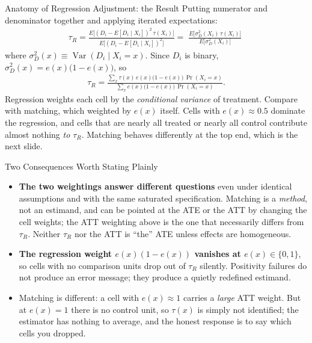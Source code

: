 \documentclass[aspectratio=169,11pt,xcolor=dvipsnames]{beamer}
\DeclareMathOperator{\Var}{Var}
\newcommand{\E}{E}
\begin{document}
\begin{frame}{Anatomy of Regression Adjustment: the Result}
Putting numerator and denominator together and applying iterated expectations:
\begin{align*}
  \tau_R
  = \frac{\E\big[(D_i-\E[D_i\mid X_i])^2\,\tau(X_i)\big]}
         {\E\big[(D_i-\E[D_i\mid X_i])^2\big]}
  = \boxed{\;\frac{\E\big[\sigma_D^2(X_i)\,\tau(X_i)\big]}{\E\big[\sigma_D^2(X_i)\big]}\;}
\end{align*}
where $\sigma_D^2(x) \equiv \Var(D_i\mid X_i = x)$. Since $D_i$ is binary,
$\sigma^2_D(x) = e(x)\big(1-e(x)\big)$, so
\begin{align*}
  \tau_R = \frac{\sum_x \tau(x)\, e(x)\big(1-e(x)\big)\,\Pr(X_i=x)}
                  {\sum_x e(x)\big(1-e(x)\big)\,\Pr(X_i=x)} .
\end{align*}
\vskip2pt
\alert{Regression weights each cell by the \emph{conditional variance} of
treatment.} Compare with matching, which weighted by $e(x)$ itself. Cells with
$e(x)\approx 0.5$ dominate the regression, and cells that are nearly all treated
or nearly all control contribute almost nothing \emph{to $\tau_R$}. Matching
behaves differently at the top end, which is the next slide.
\end{frame}

\begin{frame}[allowframebreaks,t]{Two Consequences Worth Stating Plainly}
\begin{itemize}\itemsep4pt
  \item \textbf{The two weightings answer different questions} even under
        identical assumptions and with the same saturated specification. Matching
        is a \emph{method}, not an estimand, and can be pointed at the ATE or the
        ATT by changing the cell weights; the ATT weighting above is the one that
        necessarily differs from $\tau_R$. Neither $\tau_R$ nor the ATT is
        ``the'' ATE unless effects are homogeneous.
  \item \textbf{The regression weight $e(x)(1-e(x))$ vanishes at $e(x)\in\{0,1\}$},
        so cells with no comparison units drop out of $\tau_R$ silently.
        \alert{Positivity failures do not produce an error message; they produce a
        quietly redefined estimand.}
  \item Matching is different: a cell with $e(x)\approx1$ carries a \emph{large}
        ATT weight. But at $e(x)=1$ there is no control unit, so $\tau(x)$ is
        simply not identified; the estimator has nothing to average, and the
        honest response is to say which cells you dropped.
\end{itemize}
\end{frame}
\end{document}
